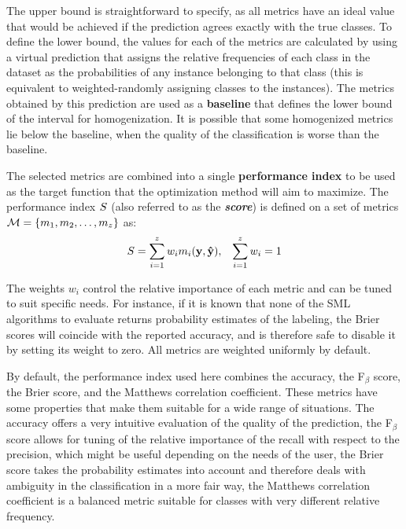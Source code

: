 	The upper bound is straightforward to specify, as all metrics have an ideal value that would be
	achieved if the prediction agrees exactly with the true classes. To define the lower bound, the
	values for each of the metrics are calculated by using a virtual prediction that assigns the
	relative frequencies of each class in the dataset as the probabilities of any instance
	belonging to that class (this is equivalent to weighted-randomly assigning classes to the
	instances). The metrics obtained by this prediction are used as a {\bf baseline} that defines
	the lower bound of the interval for homogenization. It is possible that some homogenized metrics
	lie below the baseline, when the quality of the classification is worse than the baseline.

	The selected metrics are combined into a single {\bf performance index} to be used as the target
	function that the optimization method will aim to maximize. The performance index $S$ (also
	referred to as the {\bf \emph{score}}) is defined on a set of metrics $\mathcal{M} = \{m_1, m_2,
	\ldots, m_z\}$ as:
	\begin{align}
		S &= \sum_{i=1}^z w_i m_i(\mathbf{y}, \mathbf{\hat{y}}), & \sum_{i=1}^z w_i = 1
		\label{eq:performance_index}
	\end{align}

	The weights $w_i$ control the relative importance of each metric and can be tuned to suit
	specific needs. For instance, if it is known that none of the SML algorithms to evaluate returns
	probability estimates of the labeling, the Brier scores will coincide with the reported
	accuracy, and is therefore safe to disable it by setting its weight to zero. All metrics are
	weighted uniformly by default.

	By default, the performance index used here combines the accuracy, the F$_\beta$ score, the
	Brier score, and the Matthews correlation coefficient. These metrics have some properties that
	make them suitable for a wide range of situations. The accuracy offers a very intuitive
	evaluation of the quality of the prediction, the F$_\beta$ score allows for tuning of the relative
	importance of the recall with respect to the precision, which might be useful depending on the
	needs of the user, the Brier score takes the probability estimates into account and therefore
	deals with ambiguity in the classification in a more fair way, the Matthews correlation
	coefficient is a balanced metric suitable for classes with very different relative frequency.

